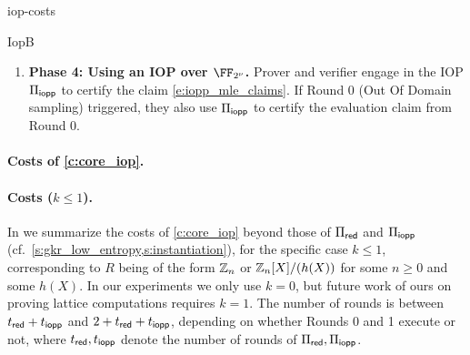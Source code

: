 \begin{lncsappendix}{iop-costs}
\begin{lncsmove}{IopB}
\begin{construction}
\begin{enumerate}[leftmargin=*]
\begin{itemize}[leftmargin=*]
 At the end of this IOR, they are left with the following claim to prove: 
%
\begin{equation}\label{e:iopp_mle_claims}
\left((\mathbf{z}, c), \ f, \ \picomfield(\bff)\right) \in \LIN( \comfield,\cC,\pack)\iflncs\else= \left\{ \left(\begin{aligned} &\inp=(\uu,\mu)\in \comfield^{\codedim}\times \comfield, \\&\oracle = g \in \comfield^{\codelength}, \\ &\wit= \bfg\in \FF_2^\codedim\end{aligned}\right) \;\middle|\;  \begin{aligned} 
&g=\Enc_{\cC}\circ \pack (\bfg) \\    &\langle \uu, \bfg\rangle = \mu  \end{aligned}\right\}\fi
\end{equation} for some vector $\mathbf{z}\in \comfield^{\codedim}$ and field element $c\in \comfield$ output during the IOR $\Pi_{\mathsf{red}}$\iflncs; here $\LIN(\comfield,\cC,\pack)$ is the constrained-code relation of \cref{s:prelims_codes}, i.e.\ $f$ is the encoding of a packed bit vector $\bfg\in\FF_2^{\codedim}$ with $\langle \mathbf{z}, \bfg\rangle = c$\fi. 
\iflncs\else\end{itemize}\fi
\item \textbf{Phase 4: Using an IOP over {$\comfield$}.} Prover and  verifier engage in the IOP $\Pi_{\mathsf{iopp}}$  to certify the claim \eqref{e:iopp_mle_claims}.  If Round 0 (Out Of Domain sampling) triggered, they also use $\Pi_{\mathsf{iopp}}$ to certify the evaluation claim from Round 0.
\end{enumerate}
\end{construction}


\end{lncsmove}
\iflncs\paragraph{Costs of \cref{c:core_iop}.} \else 


\paragraph{Costs ($k\leq 1$).}\fi  In  we summarize the costs of \cref{c:core_iop} beyond those of $\Pi_{\mathsf{red}}$ and $\Pi_{\mathsf{iopp}}$ (cf.\ \cref{s:gkr_low_entropy,s:instantiation}), for the specific case $k\leq 1$, corresponding to $R$ being of the form $\mathbb{Z}_n$ or $\mathbb{Z}_n[X]/(h(X))$ for some $n\geq 0$ and some $h(X)$. In our experiments we only use $k=0$, but future work of ours on proving lattice computations requires $k=1$. The number of rounds is  between $t_{\mathsf{red}} +t_{\mathsf{iopp}}$ and $2+t_{\mathsf{red}} +t_{\mathsf{iopp}}$, depending on whether Rounds 0 and 1 execute or not, where $t_{\mathsf{red}}, t_{\mathsf{iopp}}$ denote the number of rounds of $\Pi_{\mathsf{red}},\Pi_{\mathsf{iopp}}$.


\end{lncsappendix}
